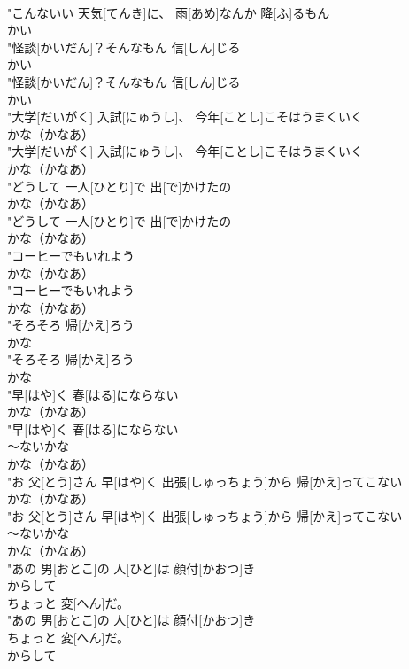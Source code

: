 \documentclass[8pt]{extreport}
\begin{document}
\begin{CJK}{UTF8}{min}
\\	"こんないい 天気[てんき]に、 雨[あめ]なんか 降[ふ]るもん
\\	かい
\\	"怪談[かいだん]？そんなもん 信[しん]じる
\\	かい
\\	"怪談[かいだん]？そんなもん 信[しん]じる
\\	かい
\\	"大学[だいがく] 入試[にゅうし]、 今年[ことし]こそはうまくいく
\\	かな（かなあ）
\\	"大学[だいがく] 入試[にゅうし]、 今年[ことし]こそはうまくいく
\\	かな（かなあ）
\\	"どうして 一人[ひとり]で 出[で]かけたの
\\	かな（かなあ）
\\	"どうして 一人[ひとり]で 出[で]かけたの
\\	かな（かなあ）
\\	"コーヒーでもいれよう
\\	かな（かなあ）
\\	"コーヒーでもいれよう
\\	かな（かなあ）
\\	"そろそろ 帰[かえ]ろう
\\	かな
\\	"そろそろ 帰[かえ]ろう
\\	かな
\\	"早[はや]く 春[はる]にならない
\\	かな（かなあ）
\\	"早[はや]く 春[はる]にならない
\\	～ないかな	
\\	かな（かなあ）
\\	"お 父[とう]さん 早[はや]く 出張[しゅっちょう]から 帰[かえ]ってこない
\\	かな（かなあ）
\\	"お 父[とう]さん 早[はや]く 出張[しゅっちょう]から 帰[かえ]ってこない
\\	～ないかな	
\\	かな（かなあ）
\\	"あの 男[おとこ]の 人[ひと]は 顔付[かおつ]き
\\	からして
\\	ちょっと 変[へん]だ。
\\	"あの 男[おとこ]の 人[ひと]は 顔付[かおつ]き
\\	ちょっと 変[へん]だ。
\\	からして

\end{CJK}
\end{document}
